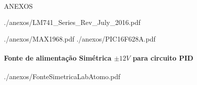 \paragraph{}
\begin{center}
\huge ANEXOS
\end{center}

 {./anexos/LM741_Series_Rev_July_2016.pdf}
\newpage 

 {./anexos/MAX1968.pdf}
\newpage
 {./anexos/PIC16F628A.pdf}
\newpage
\paragraph{Fonte de alimentação Simétrica $ \pm 12V $ para circuito PID}
 {./anexos/FonteSimetricaLabAtomo.pdf}


